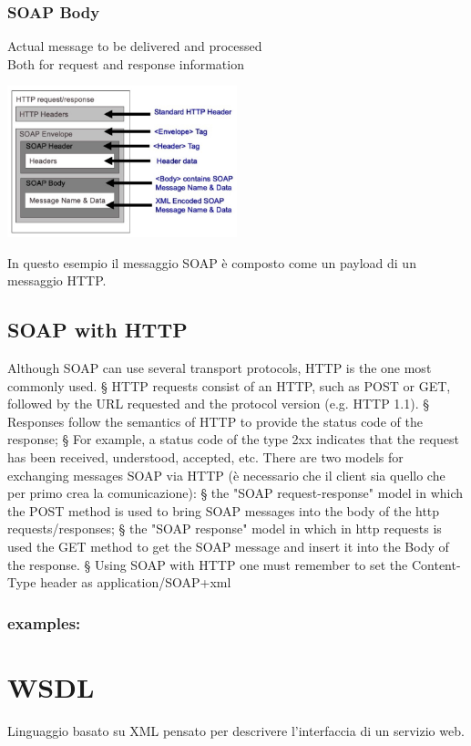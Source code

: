 \subsubsection{SOAP Body}
Actual message to be delivered and processed
\\Both for request and response information
\begin{center}
    \includegraphics[width=0.5\textwidth]{img/SoapServices3.jpg}
\end{center}
In questo esempio il messaggio SOAP è composto come un payload di un messaggio HTTP.

\subsection{SOAP with HTTP}
Although SOAP can use several transport protocols, HTTP is the one most commonly used.
§ HTTP requests consist of an HTTP, such as POST or GET, followed by the URL requested and the protocol
version (e.g. HTTP 1.1).
§ Responses follow the semantics of HTTP to provide the status code of the response;
§ For example, a status code of the type 2xx indicates that the request has been received, understood, accepted, etc.
There are two models for exchanging messages SOAP via HTTP (è necessario che il client sia quello che per primo crea la comunicazione):
§ the "SOAP request-response" model in which the POST method is used to bring SOAP messages into the body of
the http requests/responses;
§ the "SOAP response" model in which in http requests is used the GET method to get the SOAP message and insert
it into the Body of the response.
§ Using SOAP with HTTP one must remember to set the Content-Type header as application/SOAP+xml

\subsubsection{examples:}

\section{WSDL}
Linguaggio basato su XML pensato per descrivere l'interfaccia di un servizio web.

